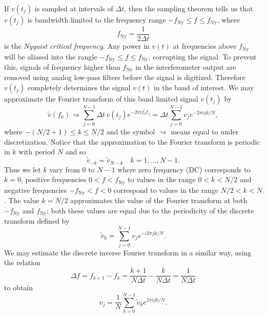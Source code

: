 If $v(t_j)$ is sampled at intervals of $\Delta t$, then the sampling
theorem\cite{Press:1992} tells us that $v(t_j)$ is bandwidth limited to the
frequency range $-f_\mathrm{Ny} \le f \le f_\mathrm{Ny}$, where
\begin{equation}
f_\mathrm{Ny} = \frac{1}{2\Delta t}
\end{equation}
is the \emph{Nyquist critical frequency}. Any power in $v(t)$ at frequencies
above $f_\mathrm{Ny}$ will be aliased into the rangle $-f_\mathrm{Ny} \le f
\le f_\mathrm{Ny}$, corrupting the signal. To prevent this, signals of
frequency higher than $f_\mathrm{Ny}$ in the interferometer output are removed
using analog low-pass filters before the signal is digitized. Therefore
$v(t_j)$ completely determines the signal $v(t)$ in the band of interest. We
may approximate the Fourier transform of this band limited signal $v(t_j)$ by
\begin{equation}
\tilde{v}(f_k) \rightsquigarrow \sum_{j=0}^{N-1} \Delta t\, v(t_j) e^{-2 \pi i f_k t_j}
= \Delta t \sum_{j=0}^{N-1} v_j e^{-2 \pi i j k / N},
\label{eq:fftapprox}
\end{equation}
where $-(N/2 + 1) \le k \le N/2$ and the symbol $\rightsquigarrow$ means
equal to under discretization.  Notice that the approximation to the
Fourier transform is periodic in $k$ with period $N$ and so 
\begin{equation}
\tilde{v}_{-k} = \tilde{v}_{N-k}\quad k = 1, \ldots, N - 1.
\end{equation}
Thus we let $k$ vary from $0$ to $N-1$ where zero frequency (DC) corresponds
to $k=0$, positive frequencies $0 < f < f_\mathrm{Ny}$ to values in the range
$0 < k < N/2$ and negative frequencies $-f_\mathrm{Ny} < f < 0$ correspond
to values in the range $N/2 < k < N$. The value $k = N/2$ approximates the
value of the Fourier transform at both $-f_\mathrm{Ny}$ and $f_\mathrm{Ny}$;
both these values are equal due to the periodicity of the discrete transform 
defined by\cite{Anderson:2001a}
\begin{equation}
\tilde{v}_k = \sum_{j=0}^{N-1} v_j e^{-i 2 \pi j k / N}.
\label{eq:dftdef}
\end{equation}
We may estimate the discrete inverse Fourier transform
in a similar way, using the relation
\begin{equation}
\Delta f = f_{k+1} - f_k = \frac{k+1}{N\Delta t} - \frac{k}{N\Delta t} =
\frac{1}{N\Delta t}
\end{equation}
to obtain
\begin{equation}
v_j = \frac{1}{N} \sum_{k=0}^{N-1} \tilde{v}_k e^{2 \pi i j k / N}.
\end{equation}

